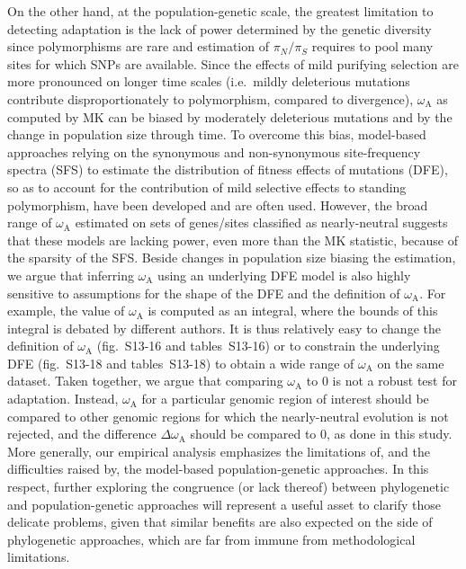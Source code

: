 \documentclass[9pt,twocolumn,twoside,lineno]{pnas-new}
\newcommand{\rateApop}{\omega_{\mathrm{A}}}
\newcommand{\pn}{\pi_N}
\newcommand{\ps}{\pi_S}
\newcommand{\pnps}{\pn / \ps}
\begin{document}
On the other hand, at the population-genetic scale, the greatest limitation to detecting adaptation is the lack of power determined by the genetic diversity since polymorphisms are rare and estimation of $\pnps$ requires to pool many sites for which SNPs are available.
Since the effects of mild purifying selection are more pronounced on longer time scales (i.e.~mildly deleterious mutations contribute disproportionately to polymorphism, compared to divergence), $\rateApop$ as computed by MK can be biased by moderately deleterious mutations\cite{eyre-walker_quantifying_2002, ho_time_2005} and by the change in population size through time\cite{eyre-walker_changing_2002}.
To overcome this bias, model-based approaches relying on the synonymous and non-synonymous site-frequency spectra (SFS) to estimate the distribution of fitness effects of mutations (DFE), so as to account for the contribution of mild selective effects to standing polymorphism, have been developed\cite{eyre-walker_estimating_2009, tataru_polydfe_2020} and are often used\cite{galtier_adaptive_2016, moutinho_variation_2019}.
However, the broad range of $\rateApop$ estimated on sets of genes/sites classified as nearly-neutral suggests that these models are lacking power, even more than the MK statistic, because of the sparsity of the SFS.
Beside changes in population size biasing the estimation\cite{rousselle_overestimation_2018}, we argue that inferring $\rateApop$ using an underlying DFE model is also highly sensitive to assumptions for the shape of the DFE and the definition of $\rateApop$.
For example, the value of $\rateApop$ is computed as an integral, where the bounds of this integral is debated by different authors\cite{galtier_adaptive_2016, tataru_polydfev2_2019}.
It is thus relatively easy to change the definition of $\rateApop$ (fig.~S13-16 and tables~S13-16) or to constrain the underlying DFE (fig.~S13-18 and tables~S13-18) to obtain a wide range of $\rateApop$ on the same dataset.
Taken together, we argue that comparing $\rateApop$ to 0 is not a robust test for adaptation.
Instead, $\rateApop$ for a particular genomic region of interest should be compared to other genomic regions for which the nearly-neutral evolution is not rejected, and the difference $\Delta \rateApop$ should be compared to 0, as done in this study.
More generally, our empirical analysis emphasizes the limitations of, and the difficulties raised by, the model-based population-genetic approaches.
In this respect, further exploring the congruence (or lack thereof) between phylogenetic and population-genetic approaches will represent a useful asset to clarify those delicate problems, given that similar benefits are also expected on the side of phylogenetic approaches, which are far from immune from methodological limitations.
\end{document}
